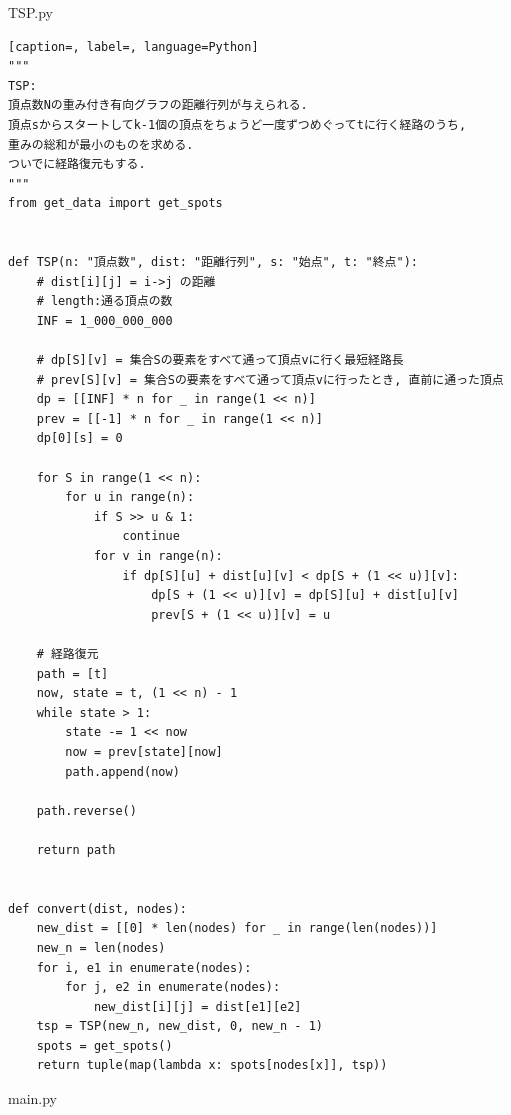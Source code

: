 \documentclass[a4paper,12pt]{jsreport}
\theoremstyle{definition}
\begin{document}
TSP.py
\begin{lstlisting}[caption=, label=, language=Python]
"""
TSP:
頂点数Nの重み付き有向グラフの距離行列が与えられる.
頂点sからスタートしてk-1個の頂点をちょうど一度ずつめぐってtに行く経路のうち,
重みの総和が最小のものを求める.
ついでに経路復元もする.
"""
from get_data import get_spots


def TSP(n: "頂点数", dist: "距離行列", s: "始点", t: "終点"):
    # dist[i][j] = i->j の距離
    # length:通る頂点の数
    INF = 1_000_000_000

    # dp[S][v] = 集合Sの要素をすべて通って頂点vに行く最短経路長
    # prev[S][v] = 集合Sの要素をすべて通って頂点vに行ったとき, 直前に通った頂点
    dp = [[INF] * n for _ in range(1 << n)]
    prev = [[-1] * n for _ in range(1 << n)]
    dp[0][s] = 0

    for S in range(1 << n):
        for u in range(n):
            if S >> u & 1:
                continue
            for v in range(n):
                if dp[S][u] + dist[u][v] < dp[S + (1 << u)][v]:
                    dp[S + (1 << u)][v] = dp[S][u] + dist[u][v]
                    prev[S + (1 << u)][v] = u

    # 経路復元
    path = [t]
    now, state = t, (1 << n) - 1
    while state > 1:
        state -= 1 << now
        now = prev[state][now]
        path.append(now)

    path.reverse()

    return path


def convert(dist, nodes):
    new_dist = [[0] * len(nodes) for _ in range(len(nodes))]
    new_n = len(nodes)
    for i, e1 in enumerate(nodes):
        for j, e2 in enumerate(nodes):
            new_dist[i][j] = dist[e1][e2]
    tsp = TSP(new_n, new_dist, 0, new_n - 1)
    spots = get_spots()
    return tuple(map(lambda x: spots[nodes[x]], tsp))
\end{lstlisting}
main.py
\end{document}
